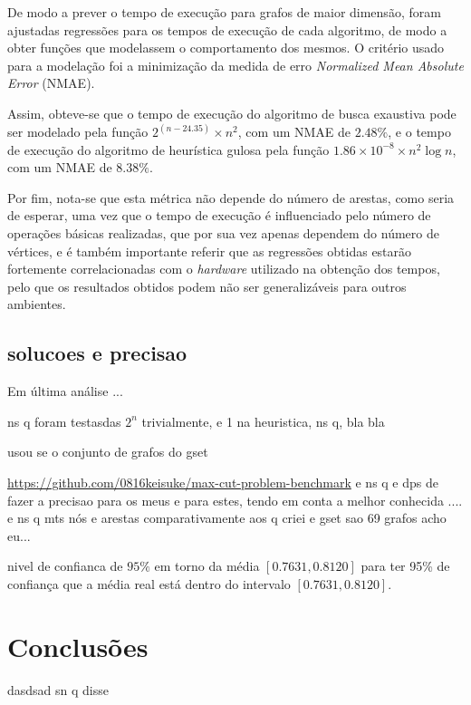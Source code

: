 \documentclass[mirror]{revdetua}
\begin{document}
De modo a prever o tempo de execução para grafos de maior dimensão, foram ajustadas regressões para os tempos de execução de cada algoritmo, de modo a obter funções que modelassem o comportamento dos mesmos. O critério usado para a modelação foi a minimização da medida de erro \textit{Normalized Mean Absolute Error} (NMAE).


Assim, obteve-se que o tempo de execução do algoritmo de busca exaustiva pode ser modelado pela função $2^{(n - 24.35)} \times n^2$, com um NMAE de $2.48\%$, e o tempo de execução do algoritmo de heurística gulosa pela função $1.86 \times 10^{-8} \times n^2 \log n$, com um NMAE de $8.38\%$.

Por fim, nota-se que esta métrica não depende do número de arestas, como seria de esperar, uma vez que o tempo de execução é influenciado pelo número de operações básicas realizadas, que por sua vez apenas dependem do número de vértices, e é também importante referir que as regressões obtidas estarão fortemente correlacionadas com o \textit{hardware} utilizado na obtenção dos tempos, pelo que os resultados obtidos podem não ser generalizáveis para outros ambientes.

\subsection{solucoes e precisao}

Em última análise ...

ns q foram testasdas $2^n$ trivialmente, e 1 na heuristica, ns q, bla bla

usou se o conjunto de grafos do gset

\url{https://github.com/0816keisuke/max-cut-problem-benchmark} e ns q e dps de fazer a precisao para os meus e para estes, tendo em conta a melhor conhecida .... e ns q mts nós e arestas comparativamente aos q criei e gset sao 69 grafos acho eu...

nivel de confianca de $95\%$ em torno da média $[0.7631, 0.8120]$ para ter 95\% de confiança que a média real está dentro do intervalo $[0.7631, 0.8120]$.


\section{Conclusões}

dasdsad sn q disse


\end{document}
